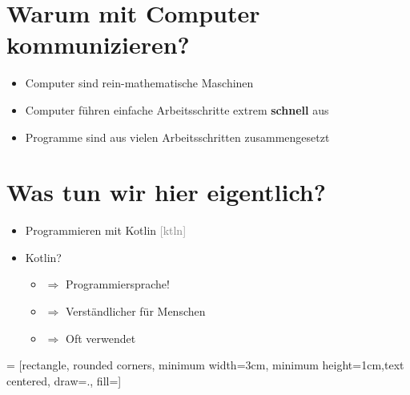 \section{Warum mit Computer kommunizieren?}
\begin{frame}
    \slidehead
    \vspace{3mm}
    \begin{itemize}[<+->]
        \item Computer sind rein-mathematische Maschinen
        \item Computer führen einfache Arbeitsschritte extrem \textbf{schnell} aus
        \item Programme sind aus vielen Arbeitsschritten zusammengesetzt
    \end{itemize}
\end{frame}

\section{Was tun wir hier eigentlich?}
\begin{frame}
    \slidehead
    \begin{itemize}[<+->]
        \item Programmieren mit Kotlin \textcolor{gray}{[\textprimstress{}k\textturnscripta{}tl\textsci{}n]}
        \item Kotlin?
            \begin{itemize}[<3->]
                \item[] $\Rightarrow$ Programmiersprache!
                \item[] $\Rightarrow$ Verständlicher für Menschen
                \item[] $\Rightarrow$ Oft verwendet
            \end{itemize}
    \end{itemize}

    \pause
    \vspace{0.75cm}

     = [rectangle, rounded corners, minimum width=3cm, minimum height=1cm,text centered, draw=., fill=]
    \centering

\end{frame}

